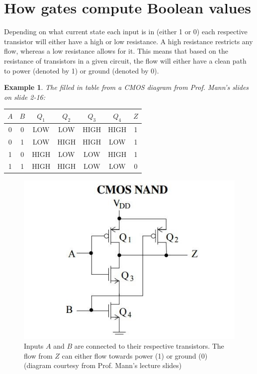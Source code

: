 \documentclass{report}
\newtheorem{ex}{Example}[section]
\begin{document}
\section{How gates compute Boolean values}
Depending on what current state each input is in (either 1 or 0) each respective transistor will either have a high or low resistance. A high resistance restricts any flow, whereas a low resistance allows for it. This means that based on the resistance of transistors in a given circuit, the flow will either have a clean path to power (denoted by 1) or ground (denoted by 0). \newpage
\begin{ex}
The filled in table from a CMOS diagram from Prof. Mann's slides on slide 2-16:
\end{ex}
\begin{center}
\begin{tabular}{ c c | c c c c | c}
$A$ & $B$ & $Q_1$ &$Q_2$ &$Q_3$ &$Q_4$ & $Z$ \\ \hline
0&0&LOW&LOW&HIGH&HIGH&1\\
0&1&LOW&HIGH&HIGH&LOW&1\\
1&0&HIGH&LOW&LOW&HIGH&1\\
1&1&HIGH&HIGH&LOW&LOW&0\\
\end{tabular}
\end{center}
\begin{figure}[ht]
\begin{center}
\includegraphics[scale=0.5]{nmos_diagram.jpg}
\end{center}
\caption{Inputs $A$ and $B$ are connected to their respective transistors. The flow from $Z$ can either flow towards power (1) or ground (0) (diagram courtesy from Prof. Mann's lecture slides)}
\end{figure}
\end{document}
